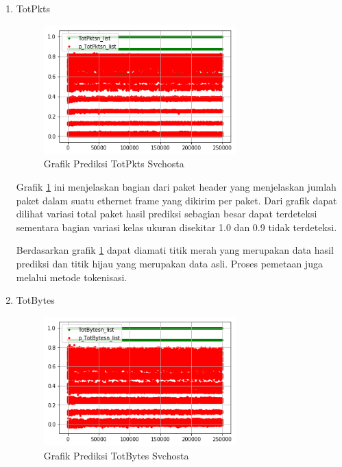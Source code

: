 \documentclass[./skripsi.tex]{subfiles}
\begin{document}
\begin{enumerate}
    \par Bagian \ref{fig:lstmm_svchosta_pred6} ini merupakan arah yang menunjukan arah transmisi dari paket baik itu multicast, maupun unicast. Dapat dilihat dari grafik hasil pendeteksian dapat mencakup hampir keseluruhan trafik kecuali kategori 1.0.
    \par Titik merah menunjukkan prediksi dan titik hijau menunjukkan data asli. Pemetaan pada data ini juga menggunakan metode tokenisasi.
    
    \item TotPkts
    \begin{figure}%
        \centering
        \includegraphics[width=0.7\textwidth]{public/assets/img/lstmm_svchosta_pred7.png}
        \caption{Grafik Prediksi TotPkts Svchosta}
        \label{fig:lstmm_svchosta_pred7}
    \end{figure}
    
    \par Grafik \ref{fig:lstmm_svchosta_pred7} ini menjelaskan bagian dari paket header yang menjelaskan jumlah paket dalam suatu ethernet frame yang dikirim per paket. Dari grafik dapat dilihat variasi total paket hasil prediksi sebagian besar dapat terdeteksi sementara bagian variasi kelas ukuran disekitar 1.0 dan 0.9 tidak terdeteksi.
    \par Berdasarkan grafik \ref{fig:lstmm_svchosta_pred7} dapat diamati titik merah yang merupakan data hasil prediksi dan titik hijau yang merupakan data asli. Proses pemetaan juga melalui metode tokenisasi.
    
    \item TotBytes
    \begin{figure}%
        \centering
        \includegraphics[width=0.7\textwidth]{public/assets/img/lstmm_svchosta_pred8.png}
        \caption{Grafik Prediksi TotBytes Svchosta}
        \label{fig:lstmm_svchosta_pred8}
    \end{figure}
    

\end{enumerate}
\end{document}
